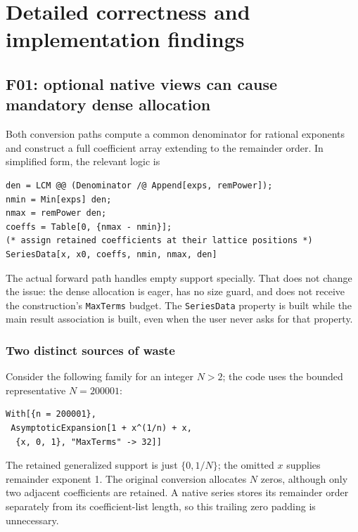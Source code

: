 \section{Detailed correctness and implementation findings}
\label{sec:findings}

\subsection{F01: optional native views can cause mandatory dense allocation}
\label{sec:f01}


\cite{core}

Both conversion paths compute a common denominator for rational exponents and construct a full coefficient array extending to the remainder order. In simplified form, the relevant logic is
\begin{lstlisting}
den = LCM @@ (Denominator /@ Append[exps, remPower]);
nmin = Min[exps] den;
nmax = remPower den;
coeffs = Table[0, {nmax - nmin}];
(* assign retained coefficients at their lattice positions *)
SeriesData[x, x0, coeffs, nmin, nmax, den]
\end{lstlisting}
The actual forward path handles empty support specially. That does not change the issue: the dense allocation is eager, has no size guard, and does not receive the construction's \texttt{MaxTerms} budget. The \texttt{SeriesData} property is built while the main result association is built, even when the user never asks for that property.

\subsubsection*{Two distinct sources of waste}

Consider the following family for an integer $N>2$; the code uses the bounded representative $N=200001$:
\begin{lstlisting}
With[{n = 200001},
 AsymptoticExpansion[1 + x^(1/n) + x,
  {x, 0, 1}, "MaxTerms" -> 32]]
\end{lstlisting}
The retained generalized support is just $\{0,1/N\}$; the omitted $x$ supplies remainder exponent 1. The original conversion allocates $N$ zeros, although only two adjacent coefficients are retained. A native series stores its remainder order separately from its coefficient-list length, so this trailing zero padding is unnecessary.

